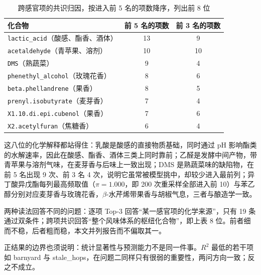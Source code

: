 \begin{table}[htbp]
\centering
\small
\caption{跨感官项的共识归因，按进入前 5 名的项数降序，列出前 8 位}
\label{tab:q2consensus}
\begin{tabular*}{\textwidth}{@{\extracolsep{\fill}}lcc@{}}
\toprule
\textbf{化合物} & \textbf{前 5 名的项数} & \textbf{前 3 名的项数} \\
\midrule
\texttt{lactic\_acid}（酸感、酯香、酒体） & 13 & 9 \\
\texttt{acetaldehyde}（青苹果、溶剂） & 10 & 10 \\
\texttt{DMS}（熟蔬菜） & 9 & 4 \\
\texttt{phenethyl\_alcohol}（玫瑰花香） & 8 & 6 \\
\texttt{beta.phellandrene}（果香） & 8 & 5 \\
\texttt{prenyl.isobutyrate}（麦芽香） & 7 & 4 \\
\texttt{X1.10.di.epi.cubenol}（果香） & 7 & 6 \\
\texttt{X2.acetylfuran}（焦糖香） & 6 & 4 \\
\bottomrule
\end{tabular*}
\end{table}

这八位的化学解释都站得住：乳酸是酸感的直接物质基础，同时通过 pH 影响酯类的水解速率，因此在酸感、酯香、酒体三类上同时靠前；乙醛是发酵中间产物，带青苹果与溶剂气味，在麦芽香与后味上一致出现；DMS 是熟蔬菜味的缺陷物，在前 5 名出现 9 次、前 3 名 4 次，说明它虽常被模型挑中，却较少进入最前列；异丁酸异戊酯每列最高频取值（$\pi=1.000$，即 200 次重采样全部进入前 10）与苯乙醇分别对应麦芽香与玫瑰花香，$\beta$-水芹烯带果香与胡椒气息，三者与酿造学一致。

两种读法回答不同的问题：逐项 Top-3 回答“某一感官项的化学来源”，只有 19 条通过双条件；跨项共识回答“整个风味体系的枢纽化合物”，即上表 8 位。前者细而不稳，后者粗而稳，本文并列报告而不偏取其一。

正结果的边界也须说明：统计显著性与预测能力不是同一件事。$R^2$ 最低的若干项如 barnyard 与 stale\_hops，在问题二同样只有很弱的重要性，两问方向一致；反之不成立。
